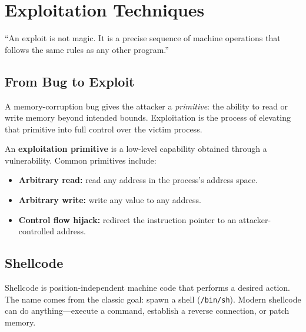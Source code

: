 \chapter{Exploitation Techniques}
\label{ch:exploitation}

\epigraph{``An exploit is not magic. It is a precise sequence of machine operations that follows the same rules as any other program.''}{}


\section{From Bug to Exploit}

A memory-corruption bug gives the attacker a \emph{primitive}: the ability to read or write memory beyond intended bounds. Exploitation is the process of elevating that primitive into full control over the victim process.

\begin{definition}
	An \textbf{exploitation primitive} is a low-level capability obtained through a vulnerability. Common primitives include:
	\begin{itemize}
		\item \textbf{Arbitrary read:} read any address in the process's address space.
		\item \textbf{Arbitrary write:} write any value to any address.
		\item \textbf{Control flow hijack:} redirect the instruction pointer to an attacker-controlled address.
	\end{itemize}
\end{definition}

\section{Shellcode}

Shellcode is position-independent machine code that performs a desired action. The name comes from the classic goal: spawn a shell (\texttt{/bin/sh}). Modern shellcode can do anything---execute a command, establish a reverse connection, or patch memory.

